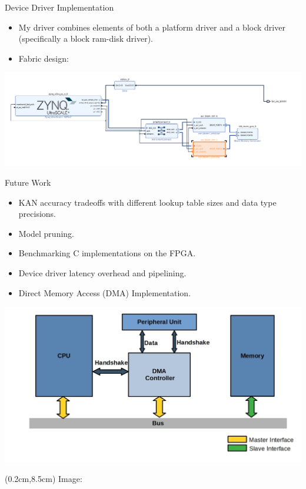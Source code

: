 \documentclass[aspectratio=169,xcolor=dvipsnames]{beamer}
\begin{document}
\begin{frame}{Device Driver Implementation}
    \begin{itemize}
        \item My driver combines elements of both a platform driver and a block driver (specifically a block ram-disk driver).
        \item Fabric design:
    \end{itemize}
    \centering
    \includegraphics[scale=0.4]{fpga_prog_img.png}

\end{frame}

\begin{frame}{Future Work}
    \begin{itemize}
        \item KAN accuracy tradeoffs with different lookup table sizes and data type precisions.
        \item Model pruning.
        \item Benchmarking C implementations on the FPGA.
        \item Device driver latency overhead and pipelining. %
        \item Direct Memory Access (DMA) Implementation.
    \end{itemize}
    \centering
    \includegraphics[scale=0.17]{dma-diagram.jpg}

    \begin{textblock*}{5cm}(0.2cm,8.5cm)
        \tiny Image: \cite{dma}
    \end{textblock*}
    
    
\end{frame}
\end{document}
